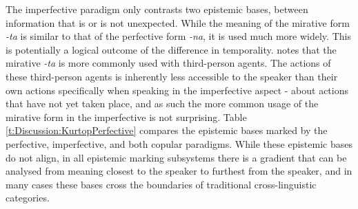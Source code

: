 The imperfective paradigm only contrasts two epistemic bases, between information that is or is not unexpected. While the meaning of the mirative form \textit{-ta} is similar to that of the perfective form \textit{-na}, it is used much more widely. This is potentially a logical outcome of the difference in temporality.  notes that the mirative \textit{-ta} is more commonly used with third-person agents. The actions of these third-person agents is inherently less accessible to the speaker than their own actions specifically when speaking in the imperfective aspect - about actions that have not yet taken place, and as such the more common usage of the mirative form in the imperfective is not surprising. Table \ref{t:Discussion:KurtopPerfective} compares the epistemic bases marked by the perfective, imperfective, and both copular paradigms. While these epistemic bases do not align, in all epistemic marking subsystems there is a gradient that can be analysed from meaning closest to the speaker to furthest from the speaker, and in many cases these bases cross the boundaries of traditional cross-linguistic categories.


